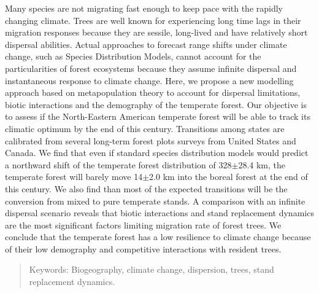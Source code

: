 \abstract
\begin{singlespace}

  Many species are not migrating fast enough to keep pace with the rapidly changing climate. Trees are well known for experiencing long time lags in their migration responses because they are sessile, long-lived and have relatively short dispersal abilities. Actual approaches to forecast range shifts under climate change, such as Species Distribution Models, cannot account for the particularities of forest ecosystems because they assume infinite dispersal and instantaneous response to climate change. Here, we propose a new modelling approach based on metapopulation theory to account for dispersal limitations, biotic interactions and the demography of the temperate forest. Our objective is to assess if the North-Eastern American temperate forest will be able to track its climatic optimum by the end of this century. Transitions among states are calibrated from several long-term forest plots surveys from United States and Canada. We find that even if standard species distribution models would predict a northward shift of the temperate forest distribution of 328$\pm$28.4 km, the temperate forest will barely move 14$\pm$2.0 km into the boreal forest at the end of this century. We also find than most of the expected transitions will be the conversion from mixed to pure temperate stands. A comparison with an infinite dispersal scenario reveals that biotic interactions and stand replacement dynamics are the most significant factors limiting migration rate of forest trees. We conclude that the temperate forest has a low resilience to climate change because of their low demography and competitive interactions with resident trees.
  \begin{quote}
    Keywords: Biogeography, climate change, dispersion, trees, stand replacement dynamics.
  \end{quote}
\end{singlespace}
\cleardoublepage


\tabledesmatieres


\listedestableaux


\listedesfigures



\cleardoublepage
